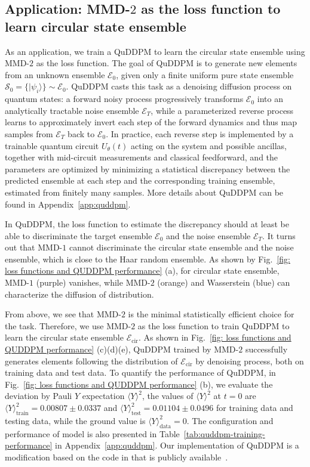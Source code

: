 \documentclass[aps,prx,reprint,superscriptaddress,amsmath,amssymb,longbibliography,floatfix]{revtex4-2}
\providecommand{\ket}[1]{|#1 \rangle}
\providecommand{\expval}[1]{\langle #1 \rangle}
\newcommand{\scE}{\mathcal{E}}
\newcommand{\scS}{\mathcal{S}}
\theoremstyle{plain}
\theoremstyle{definition}
\theoremstyle{remark}
\begin{document}
\subsection{Application: MMD-$2$ as the loss function to learn circular state ensemble}
As an application, we train a QuDDPM \cite{QuDDPM_PhysRevLett.132.100602} to learn the circular state ensemble using MMD-$2$ as the loss function. The goal of QuDDPM is to generate new elements from an unknown ensemble $\scE_0$, given only a finite uniform pure state ensemble $\scS_0=\{\ket{\psi_i}\}\sim\scE_0$. QuDDPM casts this task as a denoising diffusion process on quantum states: a forward noisy process progressively transforms $\scE_0$ into an analytically tractable noise ensemble $\scE_T$, while a parameterized reverse process learns to approximately invert each step of the forward dynamics and thus map samples from $\scE_T$ back to $\scE_0$. In practice, each reverse step is implemented by a trainable quantum circuit $U_{\theta}(t)$ acting on the system and possible ancillas, together with mid-circuit measurements and classical feedforward, and the parameters are optimized by minimizing a statistical discrepancy between the predicted ensemble at each step and the corresponding training ensemble, estimated from finitely many samples. More details about QuDDPM can be found in Appendix~\ref{app:quddpm}.



In QuDDPM, the loss function to estimate the discrepancy should at least be able to discriminate the target ensemble $\scE_0$ and the noise ensemble $\scE_T$. It turns out that MMD-$1$ cannot discriminate the circular state ensemble and the noise ensemble, which is close to the Haar random ensemble. As shown by Fig.~\ref{fig: loss functions and QUDDPM performance} (a), for circular state ensemble, MMD-$1$ (purple) vanishes, while MMD-$2$ (orange) and Wasserstein (blue) can characterize the diffusion of distribution. 

From above, we see that MMD-$2$ is the minimal statistically efficient choice for the task. Therefore, we use MMD-$2$ as the loss function to train QuDDPM to learn the circular state ensemble $\scE_{\text{cir}}$. As shown in Fig.~\ref{fig: loss functions and QUDDPM performance} (c)(d)(e), QuDDPM trained by MMD-$2$ successfully generates elements following the distribution of $\scE_{\text{cir}}$ by denoising process, both on training data and test data. To quantify the performance of QuDDPM, in Fig.~\ref{fig: loss functions and QUDDPM performance} (b), we evaluate the deviation by Pauli $Y$ expectation $\expval{Y}^2$, the values of $\expval{Y}^2$ at $t=0$ are $\expval{Y}^2_{\text{train}}=0.00807 \pm 0.0337$ and $\expval{Y}^2_{\text{test}}=0.01104 \pm 0.0496$ for training data and testing data, while the ground value is $\expval{Y}^2_{\text{data}}=0$. The configuration and performance of model is also presented in Table~\ref{tab:quddpm-training-performance} in Appendix~\ref{app:quddpm}. Our implementation of QuDDPM is a modification based on the code in \cite{QuDDPM_PhysRevLett.132.100602} that is publicly available~\cite{Github}.
\end{document}

